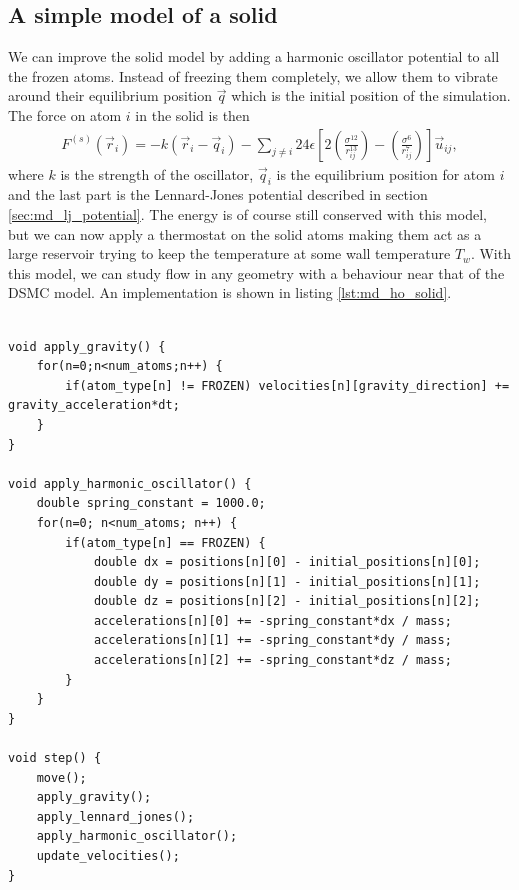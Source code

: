 \subsection{A simple model of a solid}
We can improve the solid model by adding a harmonic oscillator potential to all the frozen atoms. Instead of freezing them completely, we allow them to vibrate around their equilibrium position $\vec q$ which is the initial position of the simulation. The force on atom $i$ in the solid is then
\begin{align}
	F^{(s)}(\vec r_i) = -k(\vec r_i - \vec q_i) 
	- \sum_{j\neq i} 24\epsilon\left[2\left(\frac{\sigma^{12}}{r_{ij}^{13}}\right) - \left(\frac{\sigma^6}{r_{ij}^7}\right)\right]\vec u_{ij},
\end{align}
where $k$ is the strength of the oscillator, $\vec q_i$ is the equilibrium position for atom $i$ and the last part is the Lennard-Jones potential described in section \ref{sec:md_lj_potential}. The energy is of course still conserved with this model, but we can now apply a thermostat on the solid atoms making them act as a large reservoir trying to keep the temperature at some wall temperature $T_w$. With this model, we can study flow in any geometry with a behaviour near that of the DSMC model. An implementation is shown in listing \ref{lst:md_ho_solid}.

\begin{lstlisting}[caption=Implementation of the harmonic oscillator model of a solid., label=lst:md_ho_solid]

void apply_gravity() {
    for(n=0;n<num_atoms;n++) {
        if(atom_type[n] != FROZEN) velocities[n][gravity_direction] += gravity_acceleration*dt;
    }
}

void apply_harmonic_oscillator() {
    double spring_constant = 1000.0;
    for(n=0; n<num_atoms; n++) {
        if(atom_type[n] == FROZEN) {
            double dx = positions[n][0] - initial_positions[n][0];
            double dy = positions[n][1] - initial_positions[n][1];
            double dz = positions[n][2] - initial_positions[n][2];
            accelerations[n][0] += -spring_constant*dx / mass;
            accelerations[n][1] += -spring_constant*dy / mass;
            accelerations[n][2] += -spring_constant*dz / mass;
        }
    }
}

void step() {
    move();
    apply_gravity();
    apply_lennard_jones();
    apply_harmonic_oscillator();
    update_velocities();
}
\end{lstlisting}